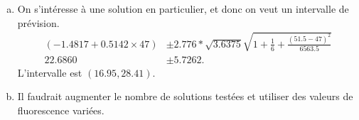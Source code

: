 \documentclass[letter, 11pt]{article}
\begin{document}
\begin{enumerate}[leftmargin=*, wide, label=\bf Exercice \arabic*:]
{\begin{enumerate}[a) ]
\item On s'intéresse à une solution en particulier, et donc on veut un intervalle de prévision.%
\begin{align*}
 (-1.4817  + 0.5142\times 47) & \pm 2.776 * \sqrt{3.6375} \sqrt{ 1 + \frac{1}{6} + \frac{(51.5-47)^2}{6563.5} }\\
 22.6860 & \pm 5.7262.
\end{align*}
L'intervalle est   $(16.95, 28.41)$.


\item Il faudrait augmenter le nombre de solutions testées et utiliser des valeurs de fluorescence variées. 

\end{enumerate}
}



\end{enumerate}
\end{document}
